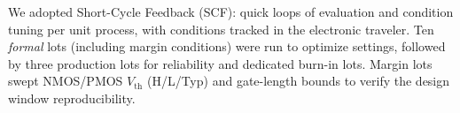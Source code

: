 We adopted Short-Cycle Feedback (SCF): quick loops of evaluation and condition tuning per unit process, with conditions tracked in the electronic traveler. Ten \emph{formal} lots (including margin conditions) were run to optimize settings, followed by three production lots for reliability and dedicated burn-in lots. Margin lots swept NMOS/PMOS $V_{\mathrm{th}}$ (H/L/Typ) and gate-length bounds to verify the design window reproducibility.
